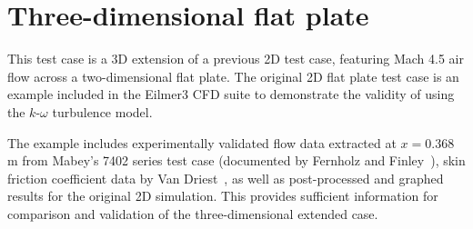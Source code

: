 \newpage
\section{Three-dimensional flat plate}
\label{chapter-3Dflatplate}
%
This test case is a 3D extension of a previous 2D test case, featuring Mach 4.5 air flow across a two-dimensional flat plate. The original 2D flat plate test case is an example included in the Eilmer3 CFD suite to demonstrate the validity of using the $k$-$\omega$ turbulence model. 

The example includes experimentally validated flow data extracted at $x=0.368$\,m from Mabey's 7402 series test case (documented by Fernholz and Finley~\cite{Fernholz1977}), skin friction coefficient data by Van Driest~\cite{vanDriest1956}, as well as post-processed and graphed results for the original 2D simulation. This provides sufficient information for comparison and validation of the three-dimensional extended case. 
